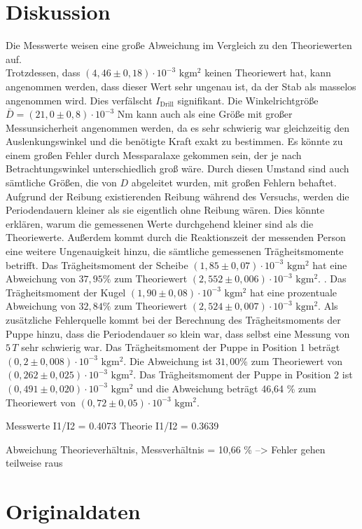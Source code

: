 \section{Diskussion}
\label{sec:Diskussion}
Die Messwerte weisen eine große Abweichung im Vergleich zu den Theoriewerten auf.  \\
Trotzdessen, dass $(4,46 \pm 0,18) \cdot 10^{-3} \,\,\unit{\kilo\gram\meter\squared}$ keinen Theoriewert hat, kann angenommen werden, dass 
dieser Wert sehr ungenau ist, da der Stab 
als masselos angenommen wird. Dies verfälscht $I_{\text{Drill}}$ signifikant. Die Winkelrichtgröße $\bar{D} = (21,0 \pm 0,8) \cdot 10^{-3} \,\,\unit{\newton\meter}$ kann auch als eine Größe mit großer Messunsicherheit angenommen
werden, da es sehr schwierig war gleichzeitig den Auslenkungswinkel und die benötigte Kraft exakt zu bestimmen. Es könnte zu einem großen 
Fehler durch Messparalaxe gekommen sein, der je nach Betrachtungswinkel unterschiedlich groß wäre. Durch diesen Umstand sind auch sämtliche 
Größen, die von $D$ abgeleitet wurden, mit großen Fehlern behaftet. Aufgrund der Reibung existierenden Reibung während des Versuchs, werden die 
Periodendauern kleiner als sie eigentlich ohne Reibung wären. Dies könnte erklären, warum die gemessenen Werte durchgehend kleiner sind als die 
Theoriewerte. Außerdem kommt durch die Reaktionszeit der messenden Person eine weitere Ungenauigkeit hinzu, die sämtliche gemessenen 
Trägheitsmomente betrifft.
Das Trägheitsmoment der Scheibe $(1,85 \pm 0,07) \cdot 10^{-3} \,\,\unit{\kilo\gram\meter\squared}$ hat eine Abweichung von $37,95 \%$ zum Theoriewert $(2,552 \pm 0,006) \cdot 10^{-3} \,\,\unit{\kilo\gram\meter\squared}$.
 . Das Trägheitsmoment der Kugel $(1,90 \pm 0,08) \cdot 10^{-3} \,\,\unit{\kilo\gram\meter\squared}$ hat eine prozentuale 
Abweichung von $32,84 \%$ zum Theoriewert $(2,524 \pm 0,007) \cdot 10^{-3} \,\,\unit{\kilo\gram\meter\squared}$. 
Als zusätzliche Fehlerquelle kommt bei der Berechnung des Trägheitsmoments der Puppe hinzu, dass die Periodendauer so klein war, dass selbst eine
Messung von $5\,T$ sehr schwierig war. Das Trägheitsmoment der Puppe in Position 1 beträgt $(0,2 \pm 0,008) \cdot 10^{-3}\,\, \unit{\kilo\gram\meter\squared}$.
 Die Abweichung ist $31,00 \%$ zum Theoriewert von $(0,262 \pm 0,025) \cdot 10^{-3}\,\, \unit{\kilo\gram\meter\squared}$.
Das Trägheitsmoment der Puppe in Position 2 ist $ (0,491 \pm 0,020) \cdot 10^{-3}\,\, \unit{\kilo\gram\meter\squared}$ und die Abweichung beträgt 46,64 \% zum Theoriewert 
von $(0,72 \pm 0,05) \cdot 10^{-3}\,\, \unit{\kilo\gram\meter\squared}$.

Messwerte I1/I2 = 0.4073
Theorie I1/I2 = 0.3639

Abweichung Theorieverhältnis, Messverhältnis = 10,66 \%
--> Fehler gehen teilweise raus 
\section{Originaldaten}
\label{sec:Originaldaten}
